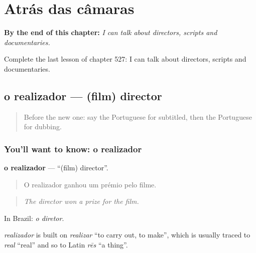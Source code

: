 
\chapter{Atrás das câmaras}
\label{ch:pt-atras-das-camaras}

\begin{chapteropening}
\textbf{By the end of this chapter:} \emph{I can talk about directors, scripts and documentaries.}

Complete the last lesson of chapter 527: I can talk about directors, scripts and documentaries.
\end{chapteropening}

\section[o realizador]{o realizador — (film) director}

\label{lesson:PT-C527-realizador}



\begin{quote}
Before the new one: say the Portuguese for subtitled, then the Portuguese for dubbing.
\end{quote}

\subsection*{You'll want to know: o realizador}
\textbf{o realizador} — \textquotedblleft{}(film) director\textquotedblright{}.

\begin{quote}
O realizador ganhou um prémio pelo filme.
\end{quote}

\begin{quote}
\emph{The director won a prize for the film.}
\end{quote}

In Brazil: \emph{o diretor}.

\begin{cousinweb}
\emph{realizador} is built on \emph{realizar} \textquotedblleft{}to carry out, to make\textquotedblright{}, which is usually traced to \emph{real} \textquotedblleft{}real\textquotedblright{} and so to Latin \emph{rēs} \textquotedblleft{}a thing\textquotedblright{}.
\end{cousinweb}


